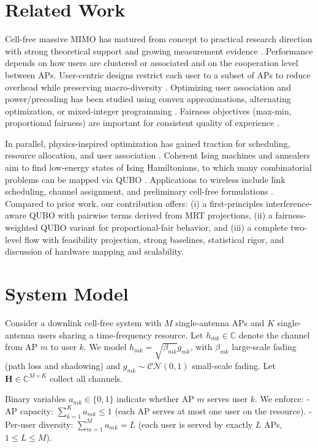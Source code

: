 {\section{Related Work}
Cell-free massive MIMO has matured from concept to practical research direction with strong theoretical support and growing measurement evidence \cite{ngo2017cell,demir2021foundations,bjornson2019massive}. Performance depends on how users are clustered or associated and on the cooperation level between APs. User-centric designs restrict each user to a subset of APs to reduce overhead while preserving macro-diversity \cite{buzzi2019user,chen2020structured}. Optimizing user association and power/precoding has been studied using convex approximations, alternating optimization, or mixed-integer programming \cite{nayebi2017precoding,bjornson2019making}. Fairness objectives (max-min, proportional fairness) are important for consistent quality of experience \cite{bashar2021max}.


In parallel, physics-inspired optimization has gained traction for scheduling, resource allocation, and user association \cite{kasi2021resource,grassl2022ising}. Coherent Ising machines and annealers aim to find low-energy states of Ising Hamiltonians, to which many combinatorial problems can be mapped via QUBO \cite{lucas2014ising,mcmahon2016fully,inagaki2016coherent,glover2018tutorial}. Applications to wireless include link scheduling, channel assignment, and preliminary cell-free formulations \cite{zhao2022joint}. Compared to prior work, our contribution offers: (i) a first-principles interference-aware QUBO with pairwise terms derived from MRT projections, (ii) a fairness-weighted QUBO variant for proportional-fair behavior, and (iii) a complete two-level flow with feasibility projection, strong baselines, statistical rigor, and discussion of hardware mapping and scalability.

\section{System Model}
Consider a downlink cell-free system with $M$ single-antenna APs and $K$ single-antenna users sharing a time-frequency resource. Let $h_{mk}\in\mathbb{C}$ denote the channel from AP $m$ to user $k$. We model $h_{mk}=\sqrt{\beta_{mk}} g_{mk}$, with $\beta_{mk}$ large-scale fading (path loss and shadowing) and $g_{mk}\sim \mathcal{CN}(0,1)$ small-scale fading. Let $\mathbf{H}\in \mathbb{C}^{M\times K}$ collect all channels.

Binary variables $a_{mk}\in\{0,1\}$ indicate whether AP $m$ serves user $k$. We enforce:
- AP capacity: $\sum_{k=1}^K a_{mk}\le 1$ (each AP serves at most one user on the resource).
- Per-user diversity: $\sum_{m=1}^M a_{mk}=L$ (each user is served by exactly $L$ APs, $1\le L\le M$).

}
